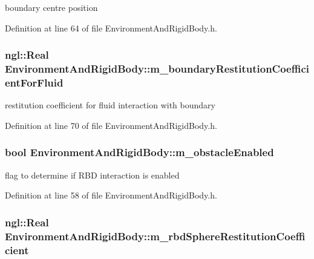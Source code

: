 boundary centre position 



Definition at line 64 of file EnvironmentAndRigidBody.h.

\hypertarget{class_environment_and_rigid_body_a45b08a9025d762d4266b03ec1ea86513}{
\subsubsection[{m\_\-boundaryRestitutionCoefficientForFluid}]{\setlength{\rightskip}{0pt plus 5cm}ngl::Real {\bf EnvironmentAndRigidBody::m\_\-boundaryRestitutionCoefficientForFluid}}}
\label{class_environment_and_rigid_body_a45b08a9025d762d4266b03ec1ea86513}


restitution coefficient for fluid interaction with boundary 



Definition at line 70 of file EnvironmentAndRigidBody.h.

\hypertarget{class_environment_and_rigid_body_a3d3cb8603f2c0a1688fc2747b4c3ee78}{
\subsubsection[{m\_\-obstacleEnabled}]{\setlength{\rightskip}{0pt plus 5cm}bool {\bf EnvironmentAndRigidBody::m\_\-obstacleEnabled}}}
\label{class_environment_and_rigid_body_a3d3cb8603f2c0a1688fc2747b4c3ee78}


flag to determine if RBD interaction is enabled 



Definition at line 58 of file EnvironmentAndRigidBody.h.

\hypertarget{class_environment_and_rigid_body_a4cfcbd844ca7a166697423f403f8d46d}{
\subsubsection[{m\_\-rbdSphereRestitutionCoefficient}]{\setlength{\rightskip}{0pt plus 5cm}ngl::Real {\bf EnvironmentAndRigidBody::m\_\-rbdSphereRestitutionCoefficient}}}
\label{class_environment_and_rigid_body_a4cfcbd844ca7a166697423f403f8d46d}


